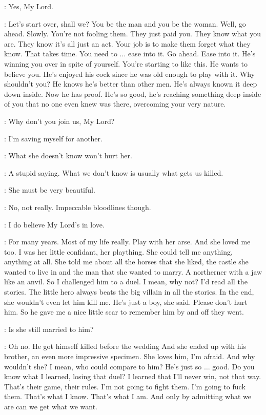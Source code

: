 \ROS: Yes, My Lord. 

\LITTLEFINGER: Let's start over, shall we? You be the man and you be the woman. Well, go ahead. Slowly. You're not fooling them. They just paid you. They know what you are. They know it's all just an act. Your job is to make them forget what they know. That takes time. You need to $\ldots$ ease into it. Go ahead. Ease into it. He's winning you over in spite of yourself. You're starting to like this. He wants to believe you. He's enjoyed his cock since he was old enough to play with it. Why shouldn't you? He knows he's better than other men. He's always known it deep down inside. Now he has proof. He's so good, he's reaching something deep inside of you that no one even knew was there, overcoming your very nature. 

\ROS: Why don't you join us, My Lord? 

\LITTLEFINGER: I'm saving myself for another. 

\ROS: What she doesn't know won't hurt her. 

\LITTLEFINGER: A stupid saying. What we don't know is usually what gets us killed. 

\ROS: She must be very beautiful. 

\LITTLEFINGER: No, not really. Impeccable bloodlines though. 

\ROS: I do believe My Lord's in love. 

\LITTLEFINGER: For many years. Most of my life really. Play with her arse. And she loved me too. I was her little confidant, her plaything. She could tell me anything, anything at all. She told me about all the horses that she liked, the castle she wanted to live in and the man that she wanted to marry. A northerner with a jaw like an anvil. So I challenged him to a duel. I mean, why not? I'd read all the stories. The little hero always beats the big villain in all the stories. In the end, she wouldn't even let him kill me. He's just a boy, she said. Please don't hurt him. So he gave me a nice little scar to remember him by and off they went. 

\ROS: Is she still married to him? 

\LITTLEFINGER: Oh no. He got himself killed before the wedding And she ended up with his brother, an even more impressive specimen. She loves him, I'm afraid. And why wouldn't she? I mean, who could compare to him? He's just so $\ldots$ good. Do you know what I learned, losing that duel? I learned that I'll never win, not that way. That's their game, their rules. I'm not going to fight them. I'm going to fuck them. That's what I know. That's what I am. And only by admitting what we are can we get what we want. 

